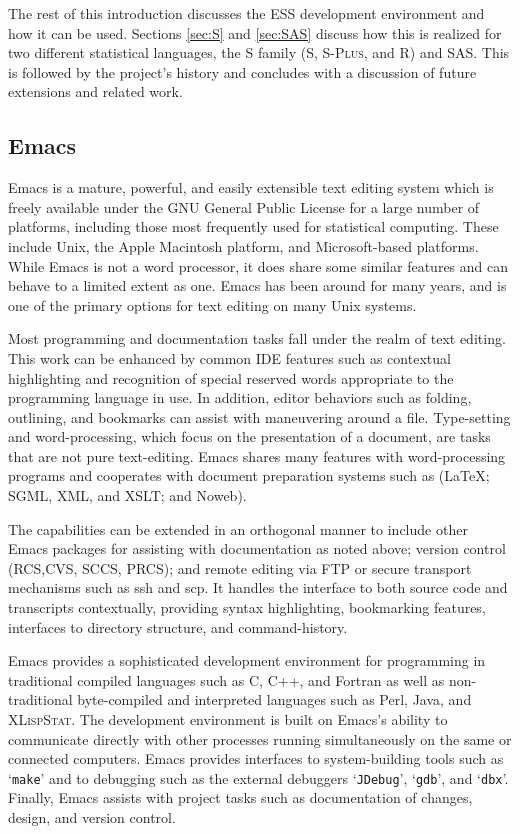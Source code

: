 \documentclass{article}
\newcommand*{\Splus}{\textsc{S-Plus}}
\newcommand*{\XLispStat}{\textsc{XLispStat}}
\newcommand{\stexttt}[1]{{\small\texttt{#1}}}
\newcommand{\file}[1]{`\stexttt{#1}'}
\begin{document}
The rest of this introduction discusses the ESS development
environment and how it can be used.  Sections \ref{sec:S} and
\ref{sec:SAS} discuss how this is realized for two different
statistical languages, the S family (S, \Splus, and R)
and SAS.  This is followed by the project's history and concludes
with a discussion of future extensions and related work.

\subsection{Emacs}
\label{sec:intro:emacs}

Emacs \citep{RMS:2000} is a mature, powerful, and easily extensible
text editing system which is freely available under the GNU General
Public License for a large number of platforms, including those most
frequently used for statistical computing.  These include Unix, the
Apple Macintosh platform, and Microsoft-based platforms.  While Emacs
is not a word processor, it does share some similar features and can
behave to a limited extent as one.  Emacs has been around for many
years, and is one of the primary options for text editing on many Unix
systems.

Most programming and documentation tasks fall under the realm of text
editing.  This work can be enhanced by common IDE features such as
contextual highlighting and recognition of special reserved words
appropriate to the programming language in use.  In addition, editor
behaviors such as folding, outlining, and bookmarks can assist with
maneuvering around a file.  Type-setting and word-processing, which
focus on the presentation of a document, are tasks that are not pure
text-editing.  Emacs shares many features with word-processing
programs and cooperates with document preparation systems such as
(\LaTeX; SGML, XML, and XSLT; and Noweb).

The capabilities can be extended in an orthogonal manner to include
other Emacs packages for assisting with documentation as noted above;
version control (RCS,CVS, SCCS, PRCS); and remote editing via FTP or
secure transport mechanisms such as ssh and scp.  It handles the
interface to both source code and transcripts contextually, providing
syntax highlighting, bookmarking features, interfaces to directory
structure, and command-history.

Emacs provides a sophisticated development environment for programming
in traditional compiled languages such as C, C++, and Fortran as well
as non-traditional byte-compiled and interpreted languages such as
Perl, Java, and \XLispStat.  The development environment is built on Emacs's
ability to communicate directly with other processes running simultaneously
on the same or connected computers.
Emacs provides interfaces to system-building tools such as
\file{make} and to debugging such as the external debuggers
\file{JDebug}, \file{gdb}, and \file{dbx}.  Finally, Emacs assists with
project tasks
such as documentation of changes, design, and version control.
\end{document}
